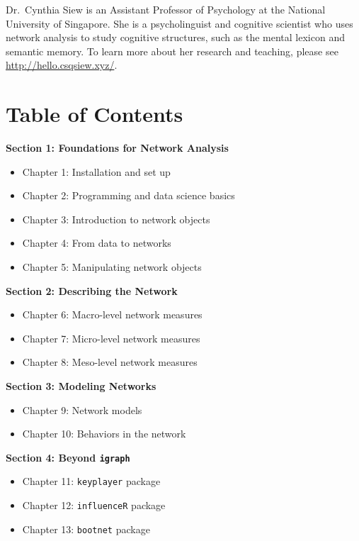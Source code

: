 \documentclass[
]{book}
\providecommand{\tightlist}{%
  \setlength{\itemsep}{0pt}\setlength{\parskip}{0pt}}
\begin{document}
Dr.~Cynthia Siew is an Assistant Professor of Psychology at the National University of Singapore. She is a psycholinguist and cognitive scientist who uses network analysis to study cognitive structures, such as the mental lexicon and semantic memory. To learn more about her research and teaching, please see \url{http://hello.csqsiew.xyz/}.

\section{Table of Contents}\label{table-of-contents}

\textbf{Section 1: Foundations for Network Analysis}

\begin{itemize}
\tightlist
\item
  Chapter 1: Installation and set up
\item
  Chapter 2: Programming and data science basics
\item
  Chapter 3: Introduction to network objects
\item
  Chapter 4: From data to networks
\item
  Chapter 5: Manipulating network objects
\end{itemize}

\textbf{Section 2: Describing the Network}

\begin{itemize}
\tightlist
\item
  Chapter 6: Macro-level network measures
\item
  Chapter 7: Micro-level network measures
\item
  Chapter 8: Meso-level network measures
\end{itemize}

\textbf{Section 3: Modeling Networks}

\begin{itemize}
\tightlist
\item
  Chapter 9: Network models
\item
  Chapter 10: Behaviors in the network
\end{itemize}

\textbf{Section 4: Beyond \texttt{igraph}}

\begin{itemize}
\tightlist
\item
  Chapter 11: \texttt{keyplayer} package
\item
  Chapter 12: \texttt{influenceR} package
\item
  Chapter 13: \texttt{bootnet} package
\end{itemize}
\end{document}
